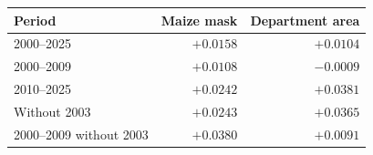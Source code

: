 \begin{tabular}{lrr}
\toprule
Period & Maize mask & Department area \\
\midrule
2000--2025 & $+0.0158$ & $+0.0104$ \\
2000--2009 & $+0.0108$ & $-0.0009$ \\
2010--2025 & $+0.0242$ & $+0.0381$ \\
Without 2003 & $+0.0243$ & $+0.0365$ \\
2000--2009 without 2003 & $+0.0380$ & $+0.0091$ \\
\bottomrule
\end{tabular}
